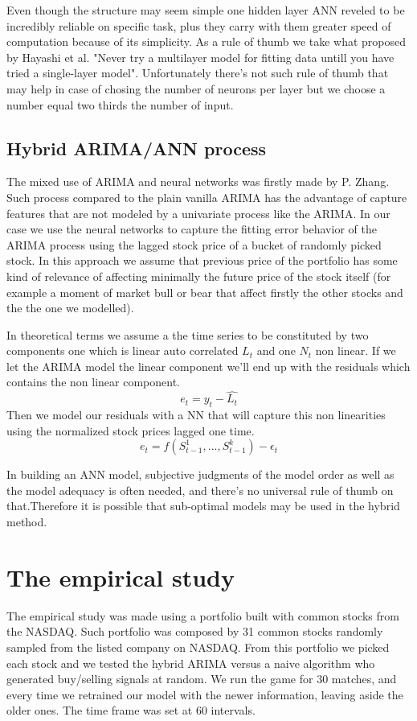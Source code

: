 \documentclass[twocolumn]{article}
\begin{document}
Even though the structure may seem simple one hidden layer ANN reveled to be incredibly reliable on specific task, plus they carry with them greater speed of computation because of its simplicity\cite{the_international_neural_network_society_inns_the_ieee_neural_network_council_cooperating_societies_multi-layer_1990}. As a rule of thumb we take what proposed by Hayashi et al. "Never try a multilayer model for fitting data untill you have tried a single-layer model". Unfortunately there's not such rule of thumb that may help in case of chosing the number of neurons per layer but we choose a number equal two thirds the number of input. 

\subsection{Hybrid ARIMA/ANN process}

The mixed use of ARIMA and neural networks was firstly made by P. Zhang.
Such process compared to the plain vanilla ARIMA has the advantage of capture features that are not modeled by a univariate process like the ARIMA. In our case we use the neural networks to capture the fitting error behavior of the ARIMA process using the lagged stock price of a bucket of randomly picked stock. In this approach we assume that previous price of the portfolio has some kind of relevance of affecting minimally the future price of the stock itself (for example a moment of market bull or bear that affect firstly the other stocks and the the one we modelled).

In theoretical terms we assume a the time series to be constituted by two components one which is linear auto correlated $L_t$ and one $N_t$ non linear. If we let the ARIMA model the linear component we'll end up with the residuals which contains the non linear component.
$$
e_t=y_t-\hat{L_t}
$$
Then we model our residuals with a NN that will capture this non linearities using the normalized stock prices lagged one time.
$$
e_t=f(S^1_{t-1},..., S^k_{t-1})-\epsilon_t
$$

In building an ANN model, subjective judgments of the model order as well as the model adequacy is often needed, and there's no universal rule of thumb on that.Therefore it is possible that sub-optimal models may be used in the hybrid method.

\section{The empirical study}
The empirical study was made using a portfolio built with common stocks from the NASDAQ. Such portfolio was composed by 31 common stocks randomly sampled from the listed company on NASDAQ. From this portfolio we picked each stock and we tested the hybrid ARIMA versus a naive algorithm who generated buy/selling signals at random. We run the game for 30 matches, and every time we retrained our model with the newer information, leaving aside the older ones. The time frame was set at 60 intervals.
\end{document}
